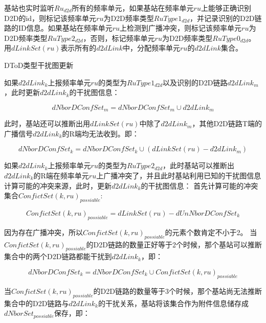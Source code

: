 \documentclass[figurelist,tablelist,algorithmlist,nomlist,masters]{seuthesix}
\begin{document}
\begin{enumerate}
		基站也实时监听$R{u_{d2d}}$所有的频率单元，如果基站在频率单元$ru$上能够正确识别D2D的id，则标记该频率单元$ru$为D2D频率类型$RuType{1_{d2d}}$，并记录识别的D2D链路的ID信息。如果基站在频率单元$ru$上检测到广播冲突，则标记该频率单元$ru$为D2D频率类型$RuType{2_{d2d}}$，否则，标记频率单元$ru$为D2D频率类型$RuType{0_{d2d}}$。
		用$dLinkSet(ru)$表示所有的$d2dLink$中，分配频率单元$ru$的$d2dLink$集合。
		
		
		DToD类型干扰图更新
		
		如果$d2dLin{k_k}$上报频率单元$ru$的类型为$RuType{1_{d2d}}$以及识别的D2D链路$d2dLin{k_m}$，此时更新$d2dLin{k_k}$的干扰图信息：
		
		\begin{equation}\label{eq2.1}
		dNborDConfSe{t_m} = dNborDConfSe{t_m} \cup d2dLin{k_m}
		\end{equation}
		
		此时，基站还可以推断出用$dLinkSet(ru)$中除了$d2dLin{k_m}$，其他D2D链路T端的广播信号$d2dLin{k_k}$的R端均无法收到。即：
		
		\begin{equation}\label{eq2.1}
		dNborDConfSe{t_k} = dNborDConfSe{t_k} \cup (dLinkSet(ru) - d2dLin{k_m})
		\end{equation}
		
		
		
		如果$d2dLin{k_k}$上报频率单元$ru$的类型为$RuType{2_{d2d}}$，此时基站可以推断出$d2dLin{k_k}$的R端在频率单元$ru$上广播冲突了，并且此时基站利用已知的干扰图信息计算可能的冲突来源，此时，更新$d2dLin{k_k}$的干扰图信息：
		首先计算可能的冲突集合$ConfictSet{(k,ru)_{possiable}}$:
		
		\begin{equation}\label{eq2.1}
		ConfictSet{(k,ru)_{possiable}} = dLinkSet(ru) - dUnNborDConfSe{t_k}
		\end{equation}
		
		因为存在广播冲突，所以$ConfictSet{(k,ru)_{possiable}}$的元素个数肯定不小于2。
		当$ConfictSet{(k,ru)_{possiable}}$的D2D链路的数量正好等于2个时候，那个基站可以推断集合中的两个D2D链路都能干扰到$d2dLin{k_k}$，即：
		
		\begin{equation}\label{eq2.1}
		dNborDConfSe{t_k} = dNborDConfSe{t_k} \cup ConfictSet{(k,ru)_{possiable}}
		\end{equation}
		
		当$ConfictSet{(k,ru)_{possiable}}$的D2D链路的数量等于3个时候，那个基站尚无法推断集合中的D2D链路与$d2dLin{k_k}$的干扰关系，基站将该集合作为附件信息储存成$dNborSe{t_{possiable}}$保存，即：
		

\end{enumerate}
\end{document}
